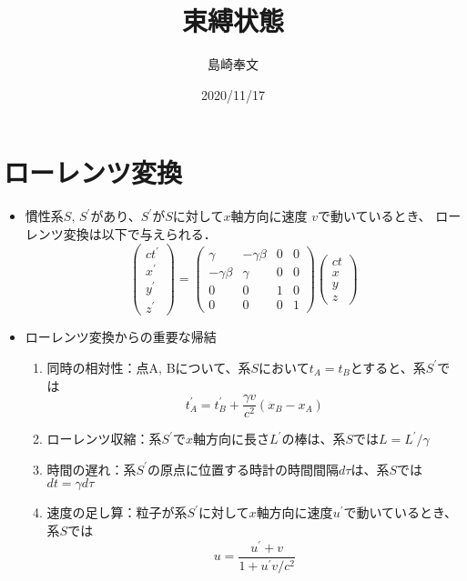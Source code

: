 \documentclass[11pt,a4j]{jarticle}
\title{束縛状態}
\author{島崎奉文}
\date{2020/11/17}
\begin{document}
\maketitle

\section{ローレンツ変換}
\begin{itemize}
\item 慣性系$S, \, S^{\prime} $があり、$ S^{\prime} $が$ S $に対して$x$軸方向に速度 $v$で動いているとき、
ローレンツ変換は以下で与えられる．
	\[
		\left(
		\begin{array}{cccc}
			ct^{\prime} \\
			x^{\prime} \\
			y^{\prime} \\
			z^{\prime}
		\end{array}
 		\right) = \left(
		\begin{array}{cccc}
			\gamma & -\gamma \beta & 0 & 0 \\
			-\gamma \beta & \gamma & 0 & 0 \\
			0 & 0 & 1 & 0 \\
			0 & 0 & 0 & 1
		\end{array}
		\right) \left(
		\begin{array}{cccc}
			ct \\
			x \\
			y \\
			z
		\end{array}
		\right)
	\]
\item ローレンツ変換からの重要な帰結
	\begin{enumerate}
	\item 同時の相対性：点A, Bについて、系$S$において$t_A = t_B$とすると、系$S^{\prime}$では
		\[
			t_A^{\prime} = t_B^{\prime} + \frac{\gamma v}{c^2}(x_B - x_A)
		\]
	\item ローレンツ収縮：系$S^{\prime}$で$x$軸方向に長さ$L^{\prime}$の棒は、系$S$では$L = L^{\prime} / \gamma$
	\item 時間の遅れ：系$S^{\prime}$の原点に位置する時計の時間間隔$d\tau$は、系$S$では$dt = \gamma d\tau$
	\item 速度の足し算：粒子が系$S^{\prime}$に対して$x$軸方向に速度$u^{\prime}$で動いているとき、系$S$では
		\[
			u = \frac{u^{\prime}+v}{1+u^{\prime}v/c^2}
		\]
	
	\end{enumerate}
\end{itemize}
\end{document}
